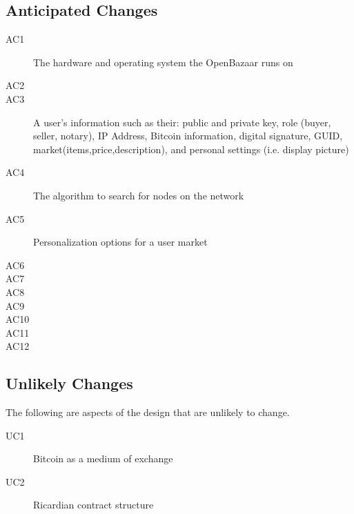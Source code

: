\documentclass{article}
\begin{document}
\subsection{Anticipated Changes} %
\begin{description}
	\item[AC1]
	The hardware and operating system the OpenBazaar runs on
	\item[AC2]
	
	\item[AC3]
	A user's information such as their: public and private key, role (buyer, seller, notary), IP Address, Bitcoin information, digital signature, GUID, market(items,price,description), and personal settings (i.e. display picture)
	\item[AC4]
	The algorithm to search for nodes on the network
	\item[AC5]
	Personalization options for a user market
	\item[AC6]
	
	\item[AC7]
	
	\item[AC8]
	
	\item[AC9]
	
	\item[AC10]
	
	\item[AC11]
	
	\item[AC12]
	
\end{description}

\subsection{Unlikely Changes}

The following are aspects of the design that are unlikely to change.

\begin{description}
\item[UC1]
Bitcoin as a medium of exchange

\item[UC2]
Ricardian contract structure


\end{description}

\end{document}
